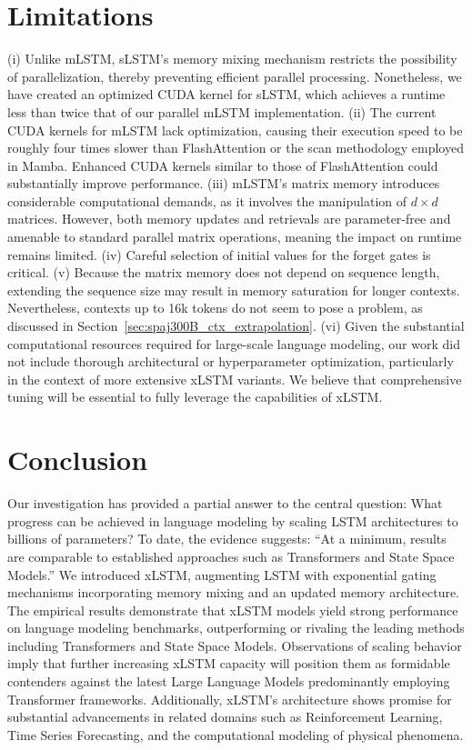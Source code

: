 \section{Limitations}

(i) Unlike mLSTM, sLSTM’s memory mixing mechanism restricts the possibility of parallelization, thereby preventing efficient parallel processing. Nonetheless, we have created an optimized CUDA kernel for sLSTM, which achieves a runtime less than twice that of our parallel mLSTM implementation. (ii) The current CUDA kernels for mLSTM lack optimization, causing their execution speed to be roughly four times slower than FlashAttention or the scan methodology employed in Mamba. Enhanced CUDA kernels similar to those of FlashAttention could substantially improve performance. (iii) mLSTM’s matrix memory introduces considerable computational demands, as it involves the manipulation of $d \times d$ matrices. However, both memory updates and retrievals are parameter-free and amenable to standard parallel matrix operations, meaning the impact on runtime remains limited. (iv) Careful selection of initial values for the forget gates is critical. (v) Because the matrix memory does not depend on sequence length, extending the sequence size may result in memory saturation for longer contexts. Nevertheless, contexts up to 16k tokens do not seem to pose a problem, as discussed in Section~\ref{sec:spaj300B_ctx_extrapolation}. (vi) Given the substantial computational resources required for large-scale language modeling, our work did not include thorough architectural or hyperparameter optimization, particularly in the context of more extensive xLSTM variants. We believe that comprehensive tuning will be essential to fully leverage the capabilities of xLSTM.

\section{Conclusion}
Our investigation has provided a partial answer to the central question: What progress can be achieved in language modeling by scaling LSTM architectures to billions of parameters? To date, the evidence suggests: ``At a minimum, results are comparable to established approaches such as Transformers and State Space Models.'' We introduced xLSTM, augmenting LSTM with exponential gating mechanisms incorporating memory mixing and an updated memory architecture. The empirical results demonstrate that xLSTM models yield strong performance on language modeling benchmarks, outperforming or rivaling the leading methods including Transformers and State Space Models. Observations of scaling behavior imply that further increasing xLSTM capacity will position them as formidable contenders against the latest Large Language Models predominantly employing Transformer frameworks. Additionally, xLSTM’s architecture shows promise for substantial advancements in related domains such as Reinforcement Learning, Time Series Forecasting, and the computational modeling of physical phenomena.

